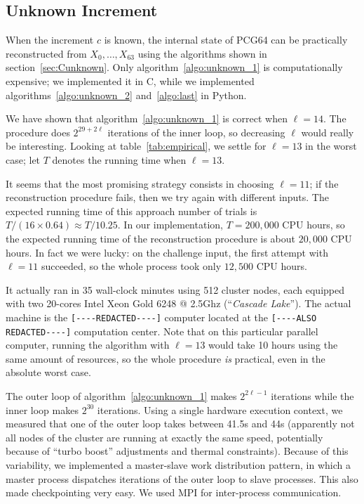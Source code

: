 \documentclass[submission,svgnames,journal=tosc]{iacrtrans}
\begin{document}
\subsection{Unknown Increment}

When the increment $c$ is known, the internal state of \textsf{PCG64} can be
practically reconstructed from $X_0, \dots, X_{63}$ using the algorithms shown
in section~\ref{sec:Cunknown}. Only algorithm~\ref{algo:unknown_1} is
computationally expensive; we implemented it in \textsf{C}, while we implemented
algorithms~\ref{algo:unknown_2} and~\ref{algo:last} in \textsf{Python}.

We have shown that algorithm~\ref{algo:unknown_1} is correct when $\ell=14$. The
procedure does $2^{29 + 2\ell}$ iterations of the inner loop, so decreasing
$\ell$ would really be interesting. Looking at table~\ref{tab:empirical}, we
settle for $\ell=13$ in the worst case; let $T$ denotes the running time when
$\ell=13$.

It seems that the most promising strategy consists in choosing $\ell=11$; if the
reconstruction procedure fails, then we try again with different inputs. The
expected running time of this approach number of trials is
$T/(16 \times 0.64) \approx T / 10.25$. In our implementation, $T = 200,000$ CPU
hours, so the expected running time of the reconstruction procedure is about
$20,000$ CPU hours. In fact we were lucky: on the challenge input, the first
attempt with $\ell=11$ succeeded, so the whole process took only $12,500$ CPU
hours.

It actually ran in 35 wall-clock minutes using 512 cluster nodes, each equipped
with two 20-cores \textsf{Intel Xeon Gold 6248 @ 2.5Ghz} (``\emph{Cascade
  Lake}''). The actual machine is the \verb|[----REDACTED----]| computer located
at the \verb|[----ALSO REDACTED----]| computation center. Note that on this
particular parallel computer, running the algorithm with $\ell=13$ would take 10
hours using the same amount of resources, so the whole procedure \emph{is}
practical, even in the absolute worst case.

The outer loop of algorithm~\ref{algo:unknown_1} makes $2^{2\ell - 1}$
iterations while the inner loop makes $2^{30}$ iterations. Using a single
hardware execution context, we measured that one of the outer loop takes between
41.5s and 44s (apparently not all nodes of the cluster are running at exactly
the same speed, potentially because of ``turbo boost'' adjustments and thermal
constraints). Because of this variability, we implemented a master-slave work
distribution pattern, in which a master process dispatches iterations of the
outer loop to slave processes. This also made checkpointing very easy. We used
\textsf{MPI} for inter-process communication.
\end{document}
